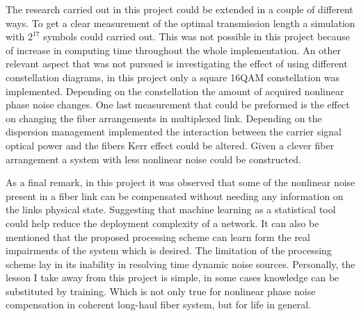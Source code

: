 The research carried out in this project could be extended in a couple of different ways. To get a clear measurement of the optimal transmission length a simulation with $2^{17}$ symbols could carried out. This was not possible in this project because of increase in computing time throughout the whole implementation. An other relevant aspect that was not pursued is investigating the effect of using different constellation diagrams, in this project only a square 16QAM constellation was implemented. Depending on the constellation the amount of acquired nonlinear phase noise changes. One last measurement that could be preformed is the effect on changing the fiber arrangements in multiplexed link. Depending on the dispersion management implemented the interaction between the carrier signal optical power and the fibers Kerr effect could be altered. Given a clever fiber arrangement a system with less nonlinear noise could be constructed.

As a final remark, in this project it was observed that some of the nonlinear noise present in a fiber link can be compensated without needing any information on the links physical state. Suggesting that machine learning as a statistical tool could help reduce the deployment complexity of a network. It can also be mentioned that the proposed processing scheme can learn form the real impairments of the system which is desired. The limitation of the processing scheme lay in its inability in resolving time dynamic noise sources. Personally, the lesson I take away from this project is simple, in some cases knowledge can be substituted by training. Which is not only true for nonlinear phase noise compensation in coherent long-haul fiber system, but for life in general.    